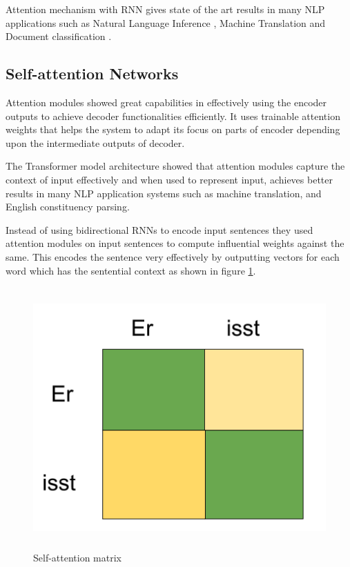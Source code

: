 \documentclass[a4paper, 11pt]{article}
\begin{document}
Attention mechanism with RNN gives state of the art results in many NLP applications such as Natural Language Inference \parencite{Parikh2016}, Machine Translation \parencite{bahdanau2014neural} and Document classification \parencite{Yang2016}.

\subsection{Self-attention Networks}

Attention modules showed great capabilities in effectively using the encoder outputs to achieve decoder functionalities efficiently. It uses trainable attention weights that helps the system to adapt its focus on parts of encoder depending upon the intermediate outputs of decoder. 

The Transformer model architecture \parencite{Vaswani2017} showed that attention modules capture the context of input effectively and when used to represent input, achieves better results in many NLP application systems such as machine translation, and English constituency parsing.

Instead of using bidirectional RNNs to encode input sentences they used attention modules on input sentences to compute influential weights against the same. This encodes the sentence very effectively by outputting vectors for each word which has the sentential context as shown in figure \ref{fig:self-attention-matrix-3}.

\begin{figure}[H]
    \centering
    \includegraphics[width=\textwidth,height=10cm,keepaspectratio=true]
    {self-attention-matrix-3.png}
    \caption{
       Self-attention matrix 
    }
    \label{fig:self-attention-matrix-3}
\end{figure}
\end{document}
